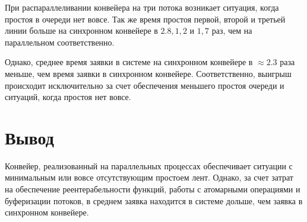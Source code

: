 При распараллеливании конвейера на три потока возникает ситуация, когда простоя в очереди нет вовсе. Так же время простоя первой, второй и третьей линии больше на синхронном конвейере в $2.8, 1,2$ и $1,7$ раз, чем на параллельном соответственно.

Однако, среднее время заявки в системе на синхронном конвейере в $\approx2.3$ раза меньше, чем время заявки в синхронном конвейере. Соответственно, выигрыш происходит исключительно за счет обеспечения меньшего простоя очереди и ситуаций, когда простоя нет вовсе.


\section{Вывод}\label{sec:exp-sum}
Конвейер, реализованный на параллельных процессах обеспечивает ситуации с минимальным или вовсе отсутствующим простоем лент. Однако, за счет затрат на обеспечение реентерабельности функций, работы с атомарными операциями и буферизации потоков, в среднем заявка находится в системе дольше, чем заявка в синхронном конвейере.   
\newpage